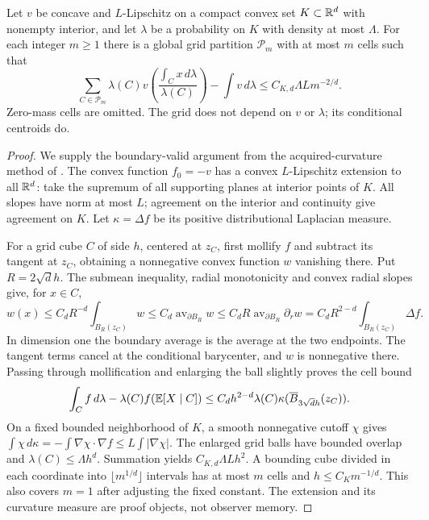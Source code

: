 \begin{lemma}\label{lem:curvature}
Let $v$ be concave and $L$-Lipschitz on a compact convex set $K\subset\mathbb R^d$ with nonempty interior, and let $\lambda$ be a probability on $K$ with density at most $\Lambda$. For each integer $m\ge1$ there is a global grid partition $\mathcal P_m$ with at most $m$ cells such that
\begin{equation}\label{eq:jensen-grid}
 \sum_{C\in\mathcal P_m}\lambda(C)v\left(\frac{\int_Cx\,d\lambda}{\lambda(C)}\right)
     -\int v\,d\lambda\le C_{K,d}\Lambda Lm^{-2/d}.
\end{equation}
Zero-mass cells are omitted. The grid does not depend on $v$ or $\lambda$; its conditional centroids do.
\end{lemma}
\begin{proof}
We supply the boundary-valid argument from the acquired-curvature method of \cite{GTFControl}. The convex function $f_0=-v$ has a convex $L$-Lipschitz extension to all $\mathbb R^d$: take the supremum of all supporting planes at interior points of $K$. All slopes have norm at most $L$; agreement on the interior and continuity give agreement on $K$. Let $\kappa=\Delta f$ be its positive distributional Laplacian measure.

For a grid cube $C$ of side $h$, centered at $z_C$, first mollify $f$ and subtract its tangent at $z_C$, obtaining a nonnegative convex function $w$ vanishing there. Put $R=2\sqrt d h$. The submean inequality, radial monotonicity and convex radial slopes give, for $x\in C$,
\[
 w(x)\le C_d R^{-d}\int_{B_R(z_C)}w
 \le C_d\operatorname{av}_{\partial B_R}w
 \le C_dR\operatorname{av}_{\partial B_R}\partial_rw
 =C_dR^{2-d}\int_{B_R(z_C)}\Delta f.
\]
In dimension one the boundary average is the average at the two endpoints. The tangent terms cancel at the conditional barycenter, and $w$ is nonnegative there. Passing through mollification and enlarging the ball slightly proves the cell bound
\[
 \int_C f\,d\lambda-\lambda(C)f(\mathbb E[X\mid C])
 \le C_dh^{2-d}\lambda(C)\kappa(\overline B_{3\sqrt d h}(z_C)).
\]
On a fixed bounded neighborhood of $K$, a smooth nonnegative cutoff $\chi$ gives
$\int\chi\,d\kappa=-\int\nabla\chi\cdot\nabla f\le L\int|\nabla\chi|$.
The enlarged grid balls have bounded overlap and $\lambda(C)\le\Lambda h^d$. Summation yields $C_{K,d}\Lambda Lh^2$. A bounding cube divided in each coordinate into $\lfloor m^{1/d}\rfloor$ intervals has at most $m$ cells and $h\le C_Km^{-1/d}$. This also covers $m=1$ after adjusting the fixed constant. The extension and its curvature measure are proof objects, not observer memory.
\end{proof}

